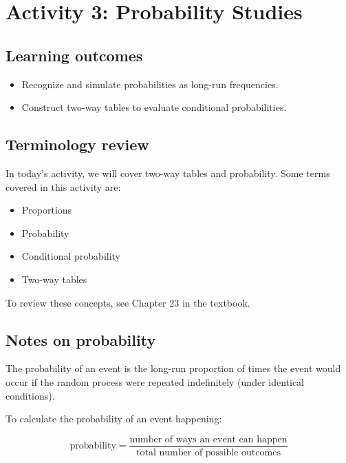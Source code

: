 \documentclass[
]{report}
\begin{document}
\newpage

\section{Activity 3: Probability Studies}\label{activity-3-probability-studies}


\subsection{Learning outcomes}\label{learning-outcomes-2}

\begin{itemize}
\item
  Recognize and simulate probabilities as long-run frequencies.
\item
  Construct two-way tables to evaluate conditional probabilities.
\end{itemize}

\subsection{Terminology review}\label{terminology-review-2}

In today's activity, we will cover two-way tables and probability. Some terms covered in this activity are:

\begin{itemize}
\item
  Proportions
\item
  Probability
\item
  Conditional probability
\item
  Two-way tables
\end{itemize}

To review these concepts, see Chapter 23 in the textbook.

\subsection*{Notes on probability}\label{notes-on-probability}

The probability of an event is the long-run proportion of times the event would occur if the random process were repeated indefinitely (under identical conditions).

To calculate the probability of an event happening:

\[\text{probability} = \frac{\text{number of ways an event can happen}}{\text{total number of possible outcomes}}\]
\end{document}
